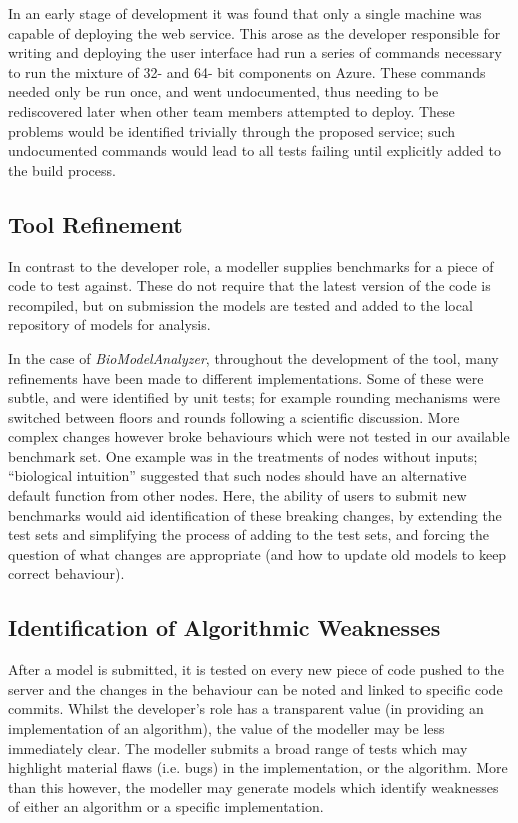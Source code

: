 \documentclass[conference]{IEEEtran}
\begin{document}
In an early stage of development it was found that only a single
machine was capable of deploying the web service. This arose as the
developer responsible for writing and deploying the user interface had
run a series of commands necessary to run the mixture of 32- and 64-
bit components on Azure. These commands needed only be run once, and
went undocumented, thus needing to be rediscovered later when other
team members attempted to deploy. These problems would be identified
trivially through the proposed service; such undocumented commands
would lead to all tests failing until explicitly added to the build
process.

\subsection{Tool Refinement}

In contrast to the developer role, a modeller supplies benchmarks for
a piece of code to test against. These do not require that the latest
version of the code is recompiled, but on submission the models are
tested and added to the local repository of models for analysis.

In the case of {\emph{BioModelAnalyzer}}, throughout the development of the
tool, many refinements have been made to different
implementations. Some of these were subtle, and were identified by
unit tests; for example rounding mechanisms were switched between
floors and rounds following a scientific discussion. More complex
changes however broke behaviours which were not tested in our
available benchmark set. One example was in the treatments of nodes
without inputs; ``biological intuition'' suggested that such nodes
should have an alternative default function from other nodes. Here,
the ability of users to submit new benchmarks would aid identification
of these breaking changes, by extending the test sets and simplifying
the process of adding to the test sets, and forcing the question of
what changes are appropriate (and how to update old models to keep
correct behaviour).


\subsection{Identification of Algorithmic Weaknesses}

After a model is submitted, it is tested on every new piece of code
pushed to the server and the changes in the behaviour can be noted and
linked to specific code commits. Whilst the developer's role has a
transparent value (in providing an implementation of an algorithm),
the value of the modeller may be less immediately clear. The modeller
submits a broad range of tests which may highlight material flaws
(i.e. bugs) in the implementation, or the algorithm. More than this
however, the modeller may generate models which identify weaknesses of
either an algorithm or a specific implementation.
\end{document}
